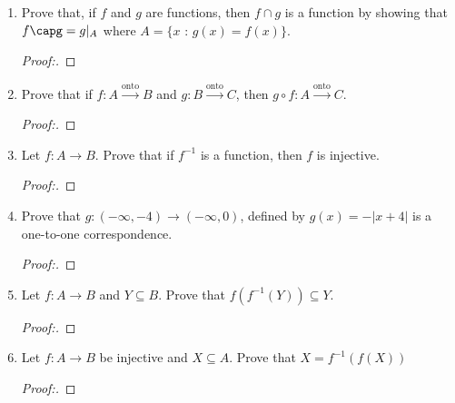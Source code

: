 \documentclass[11pt]{article}
\begin{document}
\begin{enumerate}
    \item Prove that, if $f$ and $g$ are functions, then $f \cap g$ is a function by showing that $f\capg = g|_{A}$ where \newline $A = \{x$ : $g(x) = f(x) \}.$
       \begin{proof}[Proof:\nopunct]
        \end{proof}
        
    \item Prove that if $f:A \xrightarrow{\text{onto}} B$ and $g:B\xrightarrow{\text{onto}} C$, then $g\circ f:A \xrightarrow{\text{onto}} C.$
        \begin{proof}[Proof:\nopunct]
        \end{proof}
        
    \item Let $f:A\xrightarrow{} B$. Prove that if $f^{-1}$ is a function, then $f$ is injective.
       \begin{proof}[Proof:\nopunct]
        \end{proof}
        
    \item Prove that $g:(-\infty, -4)\rightarrow(-\infty,0)$, defined by $g(x) = -|x+4|$ is a one-to-one correspondence.
       \begin{proof}[Proof:\nopunct]
        \end{proof}
        
    \item Let $f:A \rightarrow B$ and $Y \subseteq B.$ Prove that $f(f^{-1}(Y)) \subseteq Y.$
        \begin{proof}[Proof:\nopunct]
        \end{proof}
        
    \item Let $f:A \rightarrow B$ be injective and $X \subseteq A.$ \newline Prove that $X = f^{-1}(f(X))$ 
        \begin{proof}[Proof:\nopunct]
        \end{proof}
    
\end{enumerate}
\end{document}
